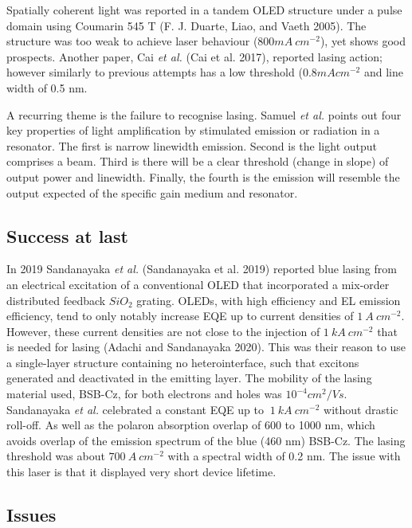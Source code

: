 \documentclass[
  letterpaper,
  DIV=11,
  numbers=noendperiod,
  oneside]{scrreprt}
\begin{document}
Spatially coherent light was reported in a tandem OLED structure under a
pulse domain using Coumarin 545 T (F. J. Duarte, Liao, and Vaeth 2005).
The structure was too weak to achieve laser behaviour
(\(800 mA\ cm^{-2}\)), yet shows good prospects. Another paper, Cai
\emph{et al.} (Cai et al. 2017), reported lasing action; however
similarly to previous attempts has a low threshold (\(0.8 mA cm^{-2}\)
and line width of 0.5 nm.

A recurring theme is the failure to recognise lasing. Samuel \emph{et
al.} points out four key properties of light amplification by stimulated
emission or radiation in a resonator. The first is narrow linewidth
emission. Second is the light output comprises a beam. Third is there
will be a clear threshold (change in slope) of output power and
linewidth. Finally, the fourth is the emission will resemble the output
expected of the specific gain medium and resonator.

\hypertarget{success-at-last}{%
\subsection{Success at last}\label{success-at-last}}

In 2019 Sandanayaka \emph{et al.} (Sandanayaka et al. 2019) reported
blue lasing from an electrical excitation of a conventional OLED that
incorporated a mix-order distributed feedback \(SiO_2\) grating. OLEDs,
with high efficiency and EL emission efficiency, tend to only notably
increase EQE up to current densities of \(1\ A \ cm^{-2}\). However,
these current densities are not close to the injection of
\(1 \ kA \ cm^{-2}\) that is needed for lasing (Adachi and Sandanayaka
2020). This was their reason to use a single-layer structure containing
no heterointerface, such that excitons generated and deactivated in the
emitting layer. The mobility of the lasing material used, BSB-Cz, for
both electrons and holes was \(10^{-4}cm^2/Vs\). Sandanayaka \emph{et
al.} celebrated a constant EQE up to \(~1\ kA \ cm^{-2}\) without
drastic roll-off. As well as the polaron absorption overlap of 600 to
1000 nm, which avoids overlap of the emission spectrum of the blue (460
nm) BSB-Cz. The lasing threshold was about \(700\ A\ cm^{-2}\) with a
spectral width of 0.2 nm. The issue with this laser is that it displayed
very short device lifetime.

\hypertarget{issues}{%
\subsection{Issues}\label{issues}}
\end{document}
